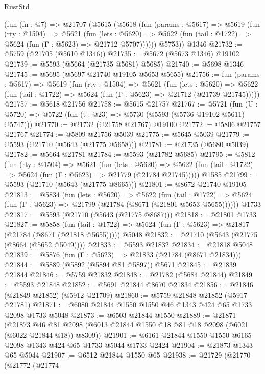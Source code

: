 \begin{lexlean}{RustStd}
\begin{coremodule}
    (fun (fn : @7) =>
    @21707
      (@5615
        (@5618
          (fun (params : @5617) =>
          @5619
            (fun (rty : @1504) =>
            @5621
              (fun (lets : @5620) =>
              @5622 (fun (tail : @1722) => @5624 (fun (Γ : @5623) => @21712 @5707))))))
        @5753))
    @1346
@21732 := @5759 (@21705 (@5610 @1346))
@21735 := @5672 (@5673 @1346) @19102
@21739 := @5593 (@5664 (@21735 @5681) @5685)
@21740 := @5698 @1346
@21745 := @5695 (@5697 @21740 @19105 @5653 @5655)
@21756 := fun (params : @5617) =>
  @5619
    (fun (rty : @1504) =>
    @5621
      (fun (lets : @5620) =>
      @5622 (fun (tail : @1722) => @5624 (fun (Γ : @5623) => @21712 (@21739 @21745)))))
@21757 := @5618 @21756
@21758 := @5615 @21757
@21767 := @5721
    (fun (U : @5720) => @5722 (fun (t : @23) => @5730 (@5593 (@5736 @19102 @5611) @5747)))
@21770 := @21732 (@21758 @21767) @19100
@21772 := @5806 @21757 @21767
@21774 := @5809 @21756 @5039
@21775 := @5645 @5039
@21779 := @5593 (@21710 (@5643 (@21775 @5658)))
@21781 := @21735 (@5680 @5039)
@21782 := @5664 @21781
@21784 := @5593 (@21782 @5685)
@21795 := @5812
    (fun (rty : @1504) =>
    @5621
      (fun (lets : @5620) =>
      @5622 (fun (tail : @1722) => @5624 (fun (Γ : @5623) => @21779 (@21784 @21745)))))
    @1585
@21799 := @5593 (@21710 (@5643 (@21775 @8665)))
@21801 := @8672 @21740 @19105
@21813 := @5834
    (fun (lets : @5620) =>
    @5622
      (fun (tail : @1722) =>
      @5624 (fun (Γ : @5623) => @21799 (@21784 (@8671 (@21801 @5653 @5655))))))
    @1733
@21817 := @5593 (@21710 (@5643 (@21775 @8687)))
@21818 := @21801 @1733
@21827 := @5858
    (fun (tail : @1722) => @5624 (fun (Γ : @5623) => @21817 (@21784 (@8671 (@21818 @5655)))))
    @5048
@21832 := @21710 (@5643 (@21775 (@8664 (@5652 @5049))))
@21833 := @5593 @21832
@21834 := @21818 @5048
@21839 := @5876 (fun (Γ : @5623) => @21833 (@21784 (@8671 @21834)))
@21844 := @5889 (@5892 (@5894 @81 @5897)) @5671
@21845 := @21839 @21844
@21846 := @5759 @21832
@21848 := @21782 (@5684 @21844)
@21849 := @5593 @21848
@21852 := @5691 @21844 @8670 @21834
@21856 := @21846 (@21849 @21852) (@5912 @21709)
@21860 := @5759 @21848 @21852 (@5917 @21781)
@21871 := @6080 @21844 @1550 @1550 @46 @1343 @424 @65 @1733 @2098 @1733 @5048
@21873 := @6503 @21844 @1550
@21889 := @21871
    (@21873 @46 @81 @2098 (@6013 @21844 @1550 @18 @81 @18 @2098 (@6021 (@6022 @21844 @18)) @8309))
@21901 := @6161 @21844 @1550 @1550 @6165 @2098 @1343 @424 @65 @1733 @5044 @1733 @2424
@21904 := @21873 @1343 @65 @5044
@21907 := @6512 @21844 @1550 @65
@21938 := @21729
    (@21770
      (@21772
        (@21774

\end{coremodule}
\end{lexlean}
